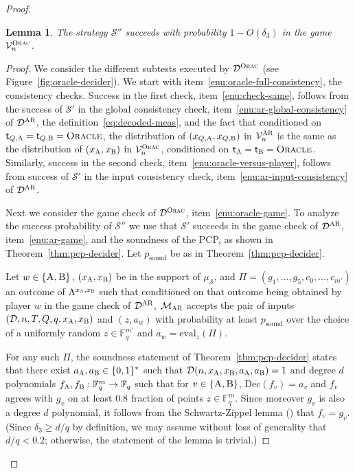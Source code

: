\documentclass[11pt]{article}
\newtheorem{lemma}[theorem]{Lemma}
\theoremstyle{definition}
\newcommand{\F}{\ensuremath{\mathbb{F}}}
\newcommand{\sampler}{\mathcal{S}}
\newcommand{\decider}{\mathcal{D}}
\newcommand{\verifier}{\mathcal{V}}
\newcommand{\strategy}{\mathscr{S}}
\newcommand{\gamestyle}[1]{\ensuremath{\textsc{#1}}\xspace}
\newcommand{\ora}{\gamestyle{Orac}}
\newcommand{\ar}{\gamestyle{AR}}
\newcommand{\labelstyle}[1]{\ensuremath{\textsc{#1}}\xspace}
\newcommand{\tvarstyle}[1]{\mathsf{#1}}
\newcommand{\tvar}{\ensuremath{\tvarstyle{t}}}
\newcommand{\alice}{\labelstyle{A}}
\newcommand{\bob}{\labelstyle{B}}
\newcommand{\oracle}{\labelstyle{Oracle}}
\newcommand{\eval}{\mathrm{eval}}
\newcommand{\pcpverifier}{\mathcal{M}_\ar}
\newcommand{\qlen}{Q}
\newcommand{\coded}{\mathrm{Dec}}
\newcommand{\soundness}{\mathrm{sound}}
\begin{document}
\begin{proof}
\begin{lemma}\label{lem:ar-ora}
  The strategy $\strategy''$ succeeds with probability $1-O(\delta_3)$ in the
  game $\verifier^\ora_n$.
\end{lemma}
	
\begin{proof}
  We consider the different subtests executed by $\decider^\ora$ (see
  Figure~\ref{fig:oracle-decider}).
  We start with item~\ref{enu:oracle-full-consistency}, the consistency checks.
  Success in the first check, item~\ref{enu:check-same}, follows from the success of
  $\strategy'$ in the global consistency check,
  item~\ref{enu:ar-global-consistency} of $\decider^\ar$, the
  definition~\eqref{eq:decoded-meas}, and the fact that conditioned on
  $\tvar_{Q,\alice}=\tvar_{Q,\bob}=\oracle$, the distribution of
  $(x_{Q,\alice},x_{Q,\bob})$ in $\verifier^\ar_n$ is the same as the
  distribution of $(x_{\alice},x_{\bob})$ in $\verifier_n^\ora$, conditioned on
  $\tvar_\alice = \tvar_\bob = \oracle$.
  Similarly, success in the second check, item~\ref{enu:oracle-versus-player},
  follows from success of $\strategy'$ in the input consistency check,
  item~\ref{enu:ar-input-consistency} of $\decider^\ar$.

  Next we consider the game check of $\decider^\ora$,
  item~\ref{enu:oracle-game}.
  To analyze the success probability of $\strategy''$ we use that $\strategy'$
  succeeds in the game check of $\decider^\ar$, item~\ref{enu:ar-game}, and the
  soundness of the PCP, as shown in Theorem~\ref{thm:pcp-decider}.
  Let $p_{\soundness}$ be as in Theorem~\ref{thm:pcp-decider}.

  Let $w\in\{\alice,\bob\}$, $(x_\alice,x_\bob)$ be in the support of
  $\mu_\sampler$, and $\Pi = (g_1,\ldots,g_5,c_0,\ldots,c_{m'})$ an outcome of
  $\Lambda^{x_\alice,x_\bob}$ such that conditioned on that outcome being
  obtained by player $w$ in the game check of $\decider^\ar$, $\pcpverifier$
  accepts the pair of inputs $(\decider, n , T, \qlen, q, x_{\alice}, x_{\bob})$
  and $(z, a_{w} )$ with probability at least $p_{\soundness}$ over the choice of
  a uniformly random $z\in \F_q^{m'}$ and $a_w = \eval_z(\Pi)$.
			
  For any such $\Pi$, the soundness statement of Theorem~\ref{thm:pcp-decider}
  states that there exist $a_\alice, a_\bob \in \{0,1\}^*$ such that
  $\decider(n, {x}_\alice, {x}_\bob, a_\alice, a_\bob) = 1$ and degree $d$
  polynomials $f_\alice, f_\bob: \F_q^m\to \F_q$ such that for $v \in
  \{\alice,\bob\}$, $\coded(f_v) = a_v$ and $f_v$ agrees with $g_v$ on at least
  $0.8$ fraction of points $z\in\F_q^m$.
  Since moreover $g_v$ is also a degree $d$ polynomial, it follows from the
  Schwartz-Zippel lemma () that $f_v = g_v$.
  (Since $\delta_3 \geq d/q$ by definition, we may assume without loss of
  generality that $d/q<0.2$; otherwise, the statement of the lemma is trivial.)
	

\end{proof}
\end{proof}
\end{document}
